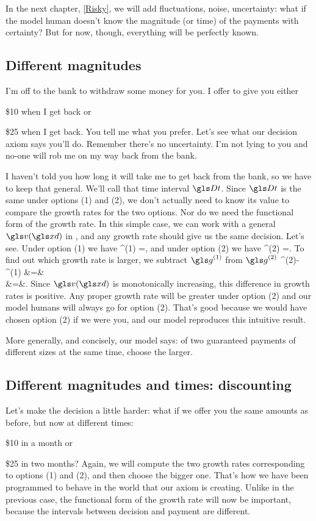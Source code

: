 In the next chapter, \cref{Risky}, we will add fluctuations, noise, uncertainty: what if the 
model human doesn't know the magnitude (or time) of the payments with certainty? But for now, though, everything will be perfectly known.

\subsection{Different magnitudes}
I'm off to the bank to withdraw some money for you. I offer to give you either
\bi
\item[(1)] \$10 when I get back or 
\item[(2)] \$25 when I get back. You tell me what you prefer.
\ei
Let's see what our decision axiom says you'll do. Remember there's no uncertainty. I'm not lying to 
you and no-one will rob me on my way back from the bank.

I haven't told you how long it will take me to get back from the bank, so we have to keep that general. We'll call that time interval $\Dt$. Since $\Dt$ is the same under options (1) and (2), we 
don't actually need to know its value to compare the growth rates for the two options. Nor do we need the functional form of the growth rate. In this simple case, we can work with a general 
$\gv(\xd)$ in , and any growth rate should give us the same decision. Let's see. Under option (1) we have
\be
\g^{(1)} =,
\ee
and under option (2) we have
\be
\g^{(2)} =.
\ee
To find out which growth rate is larger, we subtract $\g^{(1)}$ from $\g^{(2)}$ 
\bea
\g^{(2)}-\g^{(1)} &=&\\
 &=&.
\eea
Since $\gv(\xd)$ is monotonically increasing, this difference in growth rates is positive. Any proper growth rate will be greater under option (2) and 
our model humans will always go for option (2). That's good because we would have chosen option (2) if we were you, and 
our model reproduces this intuitive result.

More generally, and concisely, our model says: of two guaranteed payments of different sizes at the same time, choose the larger.

\subsection{Different magnitudes and times: discounting}
Let's make the decision a little harder: what if we offer you the same amounts as before, but now at different times:
\bi
\item[(1)] \$10 in a month or 
\item[(2)] \$25 in two months?
\ei
Again, we will compute the two growth rates corresponding to options (1) and (2), and then choose the bigger one. That's how we have been programmed to behave in the world that our axiom is creating. Unlike in the previous case, the functional form of the growth rate will now be important, because the intervals between decision and payment are different. 

